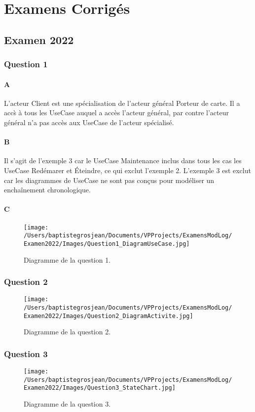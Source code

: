 \chapter{Examens Corrig\'es}\label{chap:examens}

\newpage
\section{Examen 2022}
\subsection*{Question 1}
\subsubsection*{A}
L'acteur Client est une sp\'ecialisation de l'acteur g\'en\'eral Porteur de carte. Il a acc\`s \`a tous les UseCase auquel a acc\`es l'acteur g\'en\'eral, par contre l'acteur g\'en\'eral n'a pas acc\`es aux UseCase de l'acteur sp\'ecialis\'e.
\subsubsection*{B}
Il s'agit de l'exemple 3 car le UseCase Maintenance inclus dans tous les cas les UseCase Red\'emarer et \'Eteindre, ce qui exclut l'exemple 2. L'exemple 3 est exclut car les diagrammes de UseCase ne sont pas conçus pour mod\'eliser un encha\^inement chronologique.
\subsubsection*{C}
\begin{figure}[H]
	\centering
	\texttt{[image: /Users/baptistegrosjean/Documents/VPProjects/ExamensModLog/Examen2022/Images/Question1\_DiagramUseCase.jpg]}
	\caption{Diagramme de la question 1.}
\end{figure}
\subsection*{Question 2}
\begin{figure}[H]
	\centering
	\texttt{[image: /Users/baptistegrosjean/Documents/VPProjects/ExamensModLog/Examen2022/Images/Question2\_DiagramActivite.jpg]}
	\caption{Diagramme de  la question 2.}
\end{figure}
\subsection*{Question 3}
\begin{figure}[H]
	\centering
	\texttt{[image: /Users/baptistegrosjean/Documents/VPProjects/ExamensModLog/Examen2022/Images/Question3\_StateChart.jpg]}
	\caption{Diagramme de la question 3.}
\end{figure}
